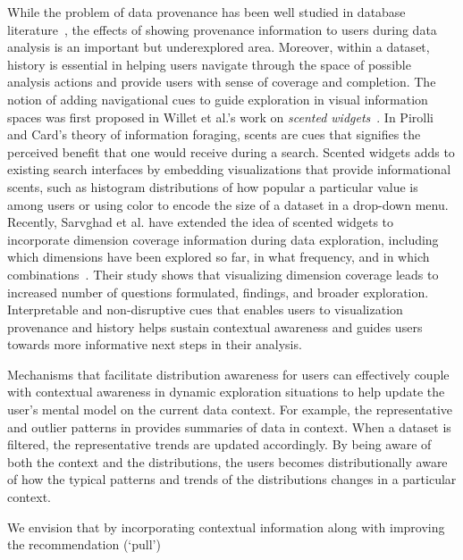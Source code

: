 \par While the problem of data provenance 
has been well studied in database literature~\cite{Buneman2006,Cui2003,Woodruff1997}, the effects of showing provenance information 
to users during data analysis is an important but underexplored area. 
Moreover, within a dataset, history is essential 
in helping users navigate through the space 
of possible analysis actions and provide users 
with sense of coverage and completion. 
The notion of adding navigational cues 
to guide exploration in visual information spaces 
was first proposed in Willet et al.'s work on \textit{scented widgets}~\cite{Willett2007}. In Pirolli and Card's theory of information foraging, 
scents are cues that signifies the perceived benefit 
that one would receive during a search. 
Scented widgets adds to existing search interfaces 
by embedding visualizations that provide informational scents, 
such as histogram distributions of how popular a particular value is among users or using color to encode the size of a dataset in a drop-down menu. 
Recently, Sarvghad et al. have extended the idea 
of scented widgets to incorporate dimension coverage 
information during data exploration, 
including which dimensions have been explored so far, 
in what frequency, and in which combinations~\cite{Sarvghad2017}. 
Their study shows that visualizing dimension coverage 
leads to increased number of questions formulated, findings, and broader exploration. Interpretable and non-disruptive cues that enables 
users to visualization provenance and history 
helps sustain contextual awareness and guides users towards 
more informative next steps in their analysis.%
\par Mechanisms that facilitate distribution awareness 
for users can effectively couple with contextual awareness 
in dynamic exploration situations 
to help update the user's mental model 
on the current data context. 
For example, the representative and outlier patterns 
in \zv provides summaries of data in context. 
When a dataset is filtered, the representative trends 
are updated accordingly. By being aware of both the 
context and the distributions, the users becomes 
distributionally aware of how the typical patterns 
and trends of the distributions changes in a particular context. %
\par We envision that by incorporating contextual 
information along with improving the recommendation (`pull') 
